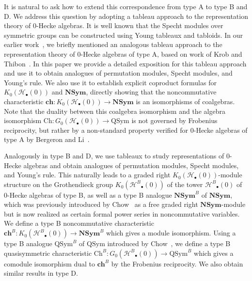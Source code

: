 \documentclass{amsart}
\newtheorem*{Young's Rule}{Young's Rule}
\theoremstyle{definition}
\theoremstyle{remark}
\numberwithin{equation}{section}
\begin{document}
It is natural to ask how to extend this correspondence from type A to type B and D. We address this question by adopting a tableau approach to the representation theory of 0-Hecke algebras. It is well known that the Specht modules over symmetric groups can be constructed using Young tableaux and tabloids. In our earlier work~\cite{H0CF, H0SR}, we briefly mentioned an analogous tableau approach to the representation theory of 0-Hecke algebras of type A, based on work of Krob and Thibon~\cite{KrobThibon}. In this paper we provide a detailed exposition for this tableau approach and use it to obtain analogues of permutation modules, Specht modules, and Young's rule. We also use it to establish explicit coproduct formulas for $K_0({\mathcal{H}_\bullet(0)})$ and ${\mathbf{NSym}}$, directly showing that the noncommutative characteristic $\mathbf{ch}: K_0({\mathcal{H}_\bullet(0)})\to{\mathbf{NSym}}$ is an isomorphisms of coalgebras. Note that the duality between this coalgebra isomorphism and the algebra isomorphism $\mathrm{Ch}: G_0({\mathcal{H}_\bullet(0)})\to{\mathrm{QSym}}$ is not governed by Frobenius reciprocity, but rather by a non-standard property verified for 0-Hecke algebras of type A by Bergeron and Li~\cite{BergeronLi}. 

Analogously in type B and D, we use tableaux to study representations of 0-Hecke algebras and obtain analogues of permutation modules, Specht modules, and Young's rule. This naturally leads to a graded right $K_0({\mathcal{H}}_\bullet(0))$-module structure on the Grothendieck group $K_0({\mathcal{H}^B}_\bullet(0))$ of the tower ${\mathcal{H}^B}_\bullet(0)$ of 0-Hecke algebras of type B, as well as a type B analogue ${\mathbf{NSym}}^B$ of ${\mathbf{NSym}}$, which was previously introduced by Chow~\cite{Chow} as a free graded right ${\mathbf{NSym}}$-module but is now realized as certain formal power series in noncommutative variables. We define a type B noncommutative characteristic $\mathbf{ch}^B: K_0({\mathcal{H}^B}_\bullet(0))\to{\mathbf{NSym}}^B$ which gives a module isomorphism. Using  a type B analogue ${\mathrm{QSym}}^B$ of ${\mathrm{QSym}}$ introduced by Chow~\cite{Chow}, we define a type B quasisymmetric characteristic $\mathrm{Ch}^B: G_0({\mathcal{H}^B}_\bullet(0))\to{\mathrm{QSym}}^B$ which gives a comodule isomorphism dual to $\mathbf{ch}^B$ by the Frobenius reciprocity. We also obtain similar results in type D.
\end{document}
